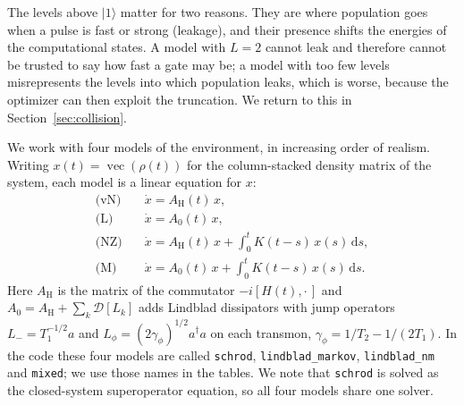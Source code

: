 \documentclass[10pt]{article}
\newcommand{\vecop}{\operatorname{vec}}
\newcommand{\dd}{\mathrm{d}}
\begin{document}
The levels above $|1\rangle$ matter for two reasons. They are where population
goes when a pulse is fast or strong (leakage), and their presence shifts the
energies of the computational states. A model with $L = 2$ cannot leak and
therefore cannot be trusted to say how fast a gate may be; a model with too few
levels misrepresents the levels into which population leaks, which is
worse, because the optimizer can then exploit the truncation. We return to
this in Section~\ref{sec:collision}.

We work with four models of the environment, in increasing order of realism.
Writing $x(t) = \vecop(\rho(t))$ for the column-stacked density matrix of the
system, each model is a linear equation for $x$:
\begin{align}
  \text{(vN)}\quad & \dot x = A_{\mathrm H}(t)\, x, \label{eq:vn}\\
  \text{(L)}\quad  & \dot x = A_0(t)\, x, \label{eq:lind}\\
  \text{(NZ)}\quad & \dot x = A_{\mathrm H}(t)\, x
       + \int_0^t K(t-s)\, x(s)\, \dd s, \label{eq:nz}\\
  \text{(M)}\quad  & \dot x = A_0(t)\, x
       + \int_0^t K(t-s)\, x(s)\, \dd s. \label{eq:mixed}
\end{align}
Here $A_{\mathrm H}$ is the matrix of the commutator $-i[H(t),\cdot\,]$ and
$A_0 = A_{\mathrm H} + \sum_k \mathcal D[L_k]$ adds Lindblad dissipators with
jump operators $L_- = T_1^{-1/2} a$ and $L_\phi = (2\gamma_\phi)^{1/2} a^\dagger a$
on each transmon, $\gamma_\phi = 1/T_2 - 1/(2T_1)$. In the code these four
models are called \texttt{schrod}, \texttt{lindblad\_markov},
\texttt{lindblad\_nm} and \texttt{mixed}; we use those names in the tables.
We note that \texttt{schrod} is solved as the closed-system superoperator
equation, so all four models share one solver.
\end{document}

